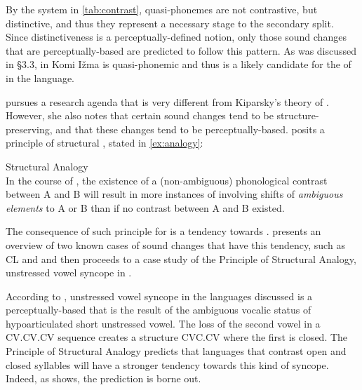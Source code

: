 \documentclass[output=paper,
modfonts
]{LSP/langsci}
\begin{document}
\largerpage
By the system in \cref{tab:contrast}, quasi-phonemes are not contrastive, but
distinctive, and thus they represent a necessary stage to the secondary
split. Since distinctiveness is a perceptually-defined notion, only
those sound changes that are perceptually-based are predicted to follow
this pattern. As was discussed in \S3.3,  in Komi Ižma
is quasi-phonemic and thus is a likely candidate for the 
of  in the language.

\citet{blevins2004a,blevins2009k} pursues a research agenda that is very different
from Kiparsky's theory of . However, she also notes that
certain sound changes tend to be structure-preserving, and that these
changes tend to be perceptually-based. \citet{blevins2004a} posits a
principle of structural , stated in \cref{ex:analogy}:

\ea\label{ex:analogy}Structural Analogy \citep[154]{blevins2004a}\\
In the course of , the existence of a
(non-ambiguous) phonological contrast between A and B will result in
more instances of  involving shifts of \emph{ambiguous elements} to A or B than if no contrast between A and B existed.
\z

The consequence of such principle for  is a tendency towards
. \citet{blevins2009k} presents an overview of two known
cases of sound changes that have this tendency, such as CL \citep{deChene1979,kavitskaya2002} and  \citep{blevins1998,blevins2004a,blevins2004d,hume2004} and then proceeds to a case study
of the Principle of Structural Analogy, unstressed vowel syncope in
.

According to \citet{blevins2009k}, unstressed vowel syncope in the  languages discussed is
a perceptually-based  that is the result of the ambiguous
vocalic status of hypoarticulated short unstressed vowel. The loss of
the second vowel in a CV.CV.CV sequence creates a structure CVC.CV where
the first  is closed. The Principle of Structural Analogy
predicts that languages that contrast open and closed syllables will
have a stronger tendency towards this kind of syncope. Indeed, as
\citet{blevins2009k} shows, the prediction is borne out.
\end{document}
